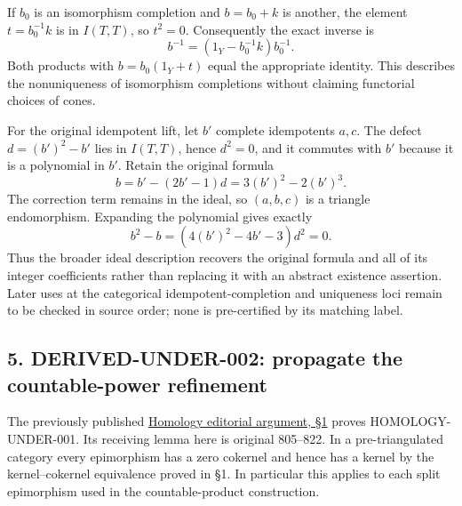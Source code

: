 \documentclass[11pt]{article}
\begin{document}
If \(b_0\) is an isomorphism completion and \(b=b_0+k\) is another,\allowbreak{} the element \(t=b_0^{-1}k\) is in \(I(T,T)\),\allowbreak{} so \(t^2=0\). Consequently the exact inverse is \[
b^{-1}=(1_Y-b_0^{-1}k)b_0^{-1}.
\] Both products with \(b=b_0(1_Y+t)\) equal the appropriate identity. This describes the nonuniqueness of isomorphism completions without claiming functorial choices of cones.

For the original idempotent lift,\allowbreak{} let \(b'\) complete idempotents \(a,c\). The defect \(d=(b')^2-b'\) lies in \(I(T,T)\),\allowbreak{} hence \(d^2=0\),\allowbreak{} and it commutes with \(b'\) because it is a polynomial in \(b'\). Retain the original formula \[
b=b'-(2b'-1)d=3(b')^2-2(b')^3.
\] The correction term remains in the ideal,\allowbreak{} so \((a,b,c)\) is a triangle endomorphism. Expanding the polynomial gives exactly \[
b^2-b=(4(b')^2-4b'-3)d^2=0.
\] Thus the broader ideal description recovers the original formula and all of its integer coefficients rather than replacing it with an abstract existence assertion. Later uses at the categorical idempotent-completion and uniqueness loci remain to be checked in source order; none is pre-certified by its matching label.

\subsection{\texorpdfstring{5. DERIVED-UNDER-002:\allowbreak{} propagate the countable-power refinement}{5.  propagate the countable-power refinement}}\label{proofs-0001-1140-derived-under-002-propagate-the-countable-power-refinement}

The previously published \href{https://github.com/KokunoYumeto/unofficial-stacks-project-ai-drafts/blob/95a51593aceb247ac7a183111678c3a0f8b8f4b5/ai-integrated/candidates/commons/stacks/errata/r60/evidence/review/PROOFS_0001_1900.md}{Homology editorial argument,\allowbreak{} §1} proves HOMOLOGY-UNDER-001. Its receiving lemma here is original 805–\allowbreak{}822. In a pre-triangulated category every epimorphism has a zero cokernel and hence has a kernel by the kernel–\allowbreak{}cokernel equivalence proved in §1. In particular this applies to each split epimorphism used in the countable-product construction.
\end{document}
